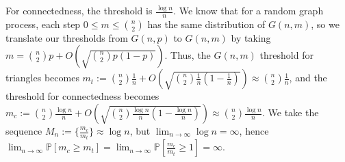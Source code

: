 \documentclass{article}
\begin{document}
For connectedness, the threshold is $\frac{\log{n}}{n}$.
We know that for a random graph process, each step $0\leq{m}\leq\binom{n}{2}$ has the same distribution of $G(n,m)$, so we translate our thresholds from $G(n,p)$ to $G(n,m)$ by taking $m=\binom{n}{2}p+O(\sqrt{\binom{n}{2}p(1-p)})$. Thus, the $G(n,m)$ threshold for triangles becomes $m_t:=\binom{n}{2}\frac{1}{n}+O(\sqrt{\binom{n}{2}\frac{1}{n}(1-\frac{1}{n})})\approx\binom{n}{2}\frac{1}{n}$, and the threshold for connectedness becomes $m_c:=\binom{n}{2}\frac{\log{n}}{n}+O(\sqrt{\binom{n}{2}\frac{\log{n}}{n}(1-\frac{\log{n}}{n})})\approx\binom{n}{2}\frac{\log{n}}{n}$. We take the sequence $M_n:=\{\frac{m_c}{m_t}\}\approx\log{n}$, but $\lim_{n\rightarrow\infty}\log{n}=\infty$, hence $\lim_{n\rightarrow\infty}\mathbb{P}[m_c\geq{m_t}]=\lim_{n\rightarrow\infty}\mathbb{P}[\frac{m_c}{m_t}\geq{1}]=\infty$.
\end{document}
